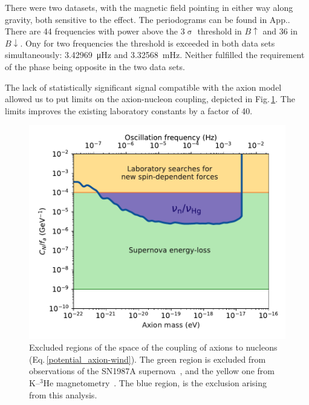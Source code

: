 There were two datasets, with the magnetic field pointing in either way along gravity, both sensitive to the effect. The periodograms can be found in App.. There are 44 frequencies with power above the 3$\upsigma$ threshold in $B\uparrow$ and 36 in $B\downarrow$. Ony for two frequencies the threshold is exceeded in both data sets simultaneously: \SI{3.42969}{\micro\hertz} and \SI{3.32568}{\milli\hertz}. Neither  fulfilled the requirement of the phase being opposite in the two data sets.

The lack of statistically significant signal compatible with the axion model allowed us to put limits on the axion-nucleon coupling, depicted in Fig.\,\ref{fig:axions_wind_limits}. The limits improves the existing laboratory constants by a factor of 40.

\begin{figure}
  \centering
  \includegraphics[width=\linewidth]{gfx/axions/psi_ill_axion_wind_limits_v1.pdf}
  \caption{Excluded regions of the space of the coupling of axions to nucleons (Eq.\,\ref{potential_axion-wind}). The green region is excluded from observations of the SN1987A supernova~\cite{PhysRevX.7.041034}, and the yellow one from K--${}^3$He magnetometry~\cite{Romalis2009_NF}. The blue region, is the exclusion arising from this analysis.}\label{fig:axions_wind_limits}
\end{figure}




